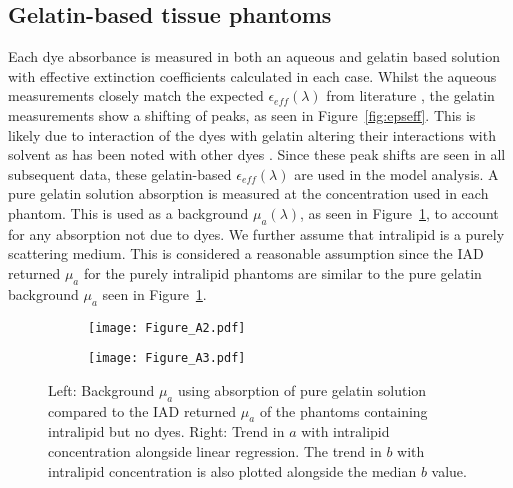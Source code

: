 \subsection{Gelatin-based tissue phantoms}\label{sec:resultsPhantoms}
Each dye absorbance is measured in both an aqueous and gelatin based solution with effective extinction coefficients calculated in each case. Whilst the aqueous measurements closely match the expected $\epsilon_{eff}(\lambda)$ from literature \cite{PhotochemCAD}, the gelatin measurements show a shifting of peaks, as seen in Figure~\ref{fig:epseff}. This is likely due to interaction of the dyes with gelatin altering their interactions with solvent as has been noted with other dyes \cite{Cook2011}.
Since these peak shifts are seen in all subsequent data, these gelatin-based $\epsilon_{eff}(\lambda)$ are used in the model analysis. A pure gelatin solution absorption is measured at the concentration used in each phantom. This is used as a background $\mu_a(\lambda)$, as seen in Figure~\ref{fig:muaback}, to account for any absorption not due to dyes.
We further assume that intralipid is a purely scattering medium. This is considered a reasonable assumption since the IAD returned $\mu_a$ for the purely intralipid phantoms are similar to the pure gelatin background $\mu_a$ seen in Figure~\ref{fig:muaback}.

\begin{figure}[htb!]
    \centering
    \begin{subfigure}{0.8\textwidth}
        \centering
        \texttt{[image: Figure\_A2.pdf]}
        \caption{}
        \label{fig:muaback}
    \end{subfigure}
    \begin{subfigure}{0.8\textwidth}
        \centering
        \texttt{[image: Figure\_A3.pdf]}
        \caption{}
        \label{fig:atrend}
    \end{subfigure}
    \caption{Left: Background $\mu_a$ using absorption of pure gelatin solution compared to the IAD returned $\mu_a$ of the phantoms containing intralipid but no dyes. Right: Trend in $a$ with intralipid concentration alongside linear regression. The trend in $b$ with intralipid concentration is also plotted alongside the median $b$ value.}
 \label{fig:intralipidIAD}
\end{figure}
\FloatBarrier

